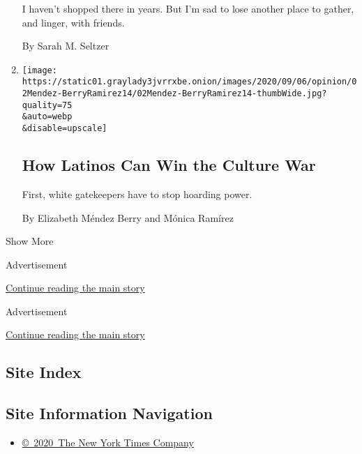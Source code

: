 \begin{enumerate}
  I haven't shopped there in years. But I'm sad to lose another place to
  gather, and linger, with friends.

  By Sarah M. Seltzer
\item
  \href{/2020/09/02/opinion/sunday/latinos-trump-election.html}{}

  \texttt{[image: https://static01.graylady3jvrrxbe.onion/images/2020/09/06/opinion/02Mendez-BerryRamirez14/02Mendez-BerryRamirez14-thumbWide.jpg?quality=75\\\&auto=webp\\\&disable=upscale]}

  \hypertarget{how-latinos-can-win-the-culture-war}{%
  \subsection{How Latinos Can Win the Culture
  War}\label{how-latinos-can-win-the-culture-war}}

  First, white gatekeepers have to stop hoarding power.

  By Elizabeth Méndez Berry and Mónica Ramírez
\end{enumerate}

Show More

Advertisement

\protect\hyperlink{after-mid1}{Continue reading the main story}

Advertisement

\protect\hyperlink{after-mktg}{Continue reading the main story}

\hypertarget{site-index}{%
\subsection{Site Index}\label{site-index}}

\hypertarget{site-information-navigation}{%
\subsection{Site Information
Navigation}\label{site-information-navigation}}

\begin{itemize}
\tightlist
\item
  \href{https://help.nytimes3xbfgragh.onion/hc/en-us/articles/115014792127-Copyright-notice}{©~2020~The
  New York Times Company}
\end{itemize}

